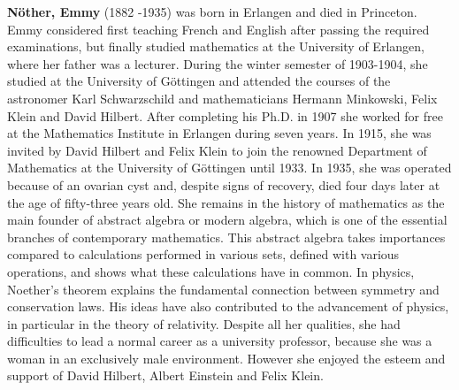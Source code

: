 \textbf{Nöther, Emmy} (1882 -1935) was born in Erlangen and died in Princeton. Emmy considered first teaching French and English after passing the required examinations, but finally studied mathematics at the University of Erlangen, where her father was a lecturer. During the winter semester of 1903-1904, she studied at the University of Göttingen and attended the courses of the astronomer Karl Schwarzschild and mathematicians Hermann Minkowski, Felix Klein and David Hilbert. After completing his Ph.D. in 1907 she worked for free at the Mathematics Institute in Erlangen during seven years. In 1915, she was invited by David Hilbert and Felix Klein to join the renowned Department of Mathematics at the University of Göttingen until 1933. In 1935, she was operated because of an ovarian cyst and, despite signs of recovery, died four days later at the age of fifty-three years old. She remains in the history of mathematics as the main founder of abstract algebra or modern algebra, which is one of the essential branches of contemporary mathematics. This abstract algebra takes importances compared to calculations performed in various sets, defined with various operations, and shows what these calculations have in common. In physics, Noether's theorem explains the fundamental connection between symmetry and conservation laws. His ideas have also contributed to the advancement of physics, in particular in the theory of relativity. Despite all her qualities, she had difficulties to lead a normal career as a university professor, because she was a woman in an exclusively male environment. However she enjoyed the esteem and support of David Hilbert, Albert Einstein and Felix Klein.

{}

